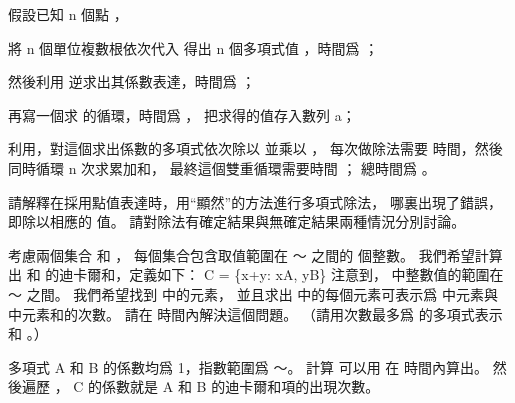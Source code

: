 \startANSWER
假設已知 n 個點 ，
\startigBase[n]
\item 將 n 個單位複數根依次代入  得出 n 個多項式值 ，時間爲 ；
\item 然後利用  逆求出其係數表達，時間爲 ；
\item 再寫一個求  的循環，時間爲 ，
把求得的值存入數列 a；
\item 利用\inexercise[30.1-2]，對這個求出係數的多項式依次除以  並乘以 ，
每次做除法需要  時間，然後同時循環 n 次求累加和，
最終這個雙重循環需要時間 ；
\stopigBase
總時間爲 。
\stopANSWER

\startEXERCISE
請解釋在採用點值表達時，用“顯然”的方法進行多項式除法，
哪裏出現了錯誤，即除以相應的  值。
請對除法有確定結果與無確定結果兩種情況分別討論。
\stopEXERCISE

\startANSWER
{}
\stopANSWER

\startEXERCISE
考慮兩個集合  和 ，
每個集合包含取值範圍在 ～ 之間的  個整數。
我們希望計算出  和  的{\EMP 迪卡爾和}，定義如下：
\startformula
C = \{x+y: x\in A, y\in B\}
\stopformula
注意到，  中整數值的範圍在 ～ 之間。
我們希望找到  中的元素，
並且求出  中的每個元素可表示爲  中元素與  中元素和的次數。
請在  時間內解決這個問題。
（\hint 請用次數最多爲  的多項式表示  和 。）
\stopEXERCISE

\startANSWER
多項式 A 和 B 的係數均爲 1，指數範圍爲 ～。
計算  可以用  在  時間內算出。
然後遍歷 ， C 的係數就是 A 和 B 的迪卡爾和項的出現次數。
\stopANSWER

\stopsection
